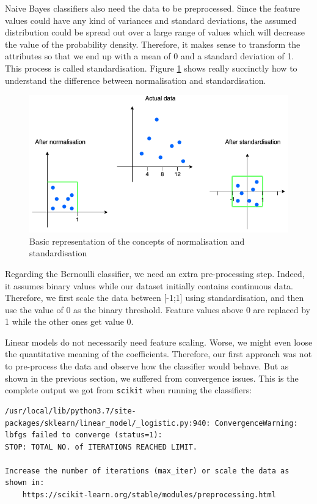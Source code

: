 Naive Bayes classifiers also need the data to be preprocessed. Since the feature values could have any kind of variances and standard deviations, the assumed distribution could be spread out over a large range of values which will decrease the value of the probability density. Therefore, it makes sense to transform the attributes so that we end up with a mean of 0 and a standard deviation of 1. This process is called standardisation. Figure \ref{fig:norm_vs_stand} shows really succinctly how to understand the difference between normalisation and standardisation.
\begin{figure}[!ht]
\centering
  \includegraphics[width=\linewidth]{Figures/norm_vs_stand.png}
  \captionsetup{justification=centering}
  \caption{Basic representation of the concepts of normalisation and standardisation}
  \label{fig:norm_vs_stand}
\end{figure}
Regarding the Bernoulli classifier, we need an extra pre-processing step. Indeed, it assumes binary values while our dataset initially contains continuous data. Therefore, we first scale the data between [-1;1] using standardisation, and then use the value of 0 as the binary threshold. Feature values above 0 are replaced by 1 while the other ones get value 0.

Linear models do not necessarily need feature scaling. Worse, we might even loose the quantitative meaning of the coefficients. Therefore, our first approach was not to pre-process the data and observe how the classifier would behave. But as shown in the previous section, we suffered from convergence issues. This is the complete output we got from \texttt{scikit} when running the classifiers:
\begin{lstlisting}
/usr/local/lib/python3.7/site-packages/sklearn/linear_model/_logistic.py:940: ConvergenceWarning: lbfgs failed to converge (status=1):
STOP: TOTAL NO. of ITERATIONS REACHED LIMIT.

Increase the number of iterations (max_iter) or scale the data as shown in:
    https://scikit-learn.org/stable/modules/preprocessing.html
\end{lstlisting}

